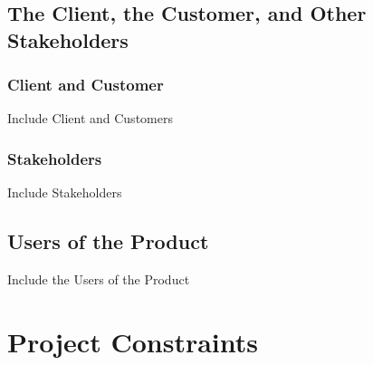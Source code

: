 \documentclass [11pt]{article}
\begin{document}
\subsection{The Client, the Customer, and Other Stakeholders}

\subsubsection{Client and Customer}
Include Client and Customers

\subsubsection{Stakeholders}
 Include Stakeholders
%

\subsection{Users of the Product} 
Include the Users of the Product



\section{\textbf{Project Constraints}}
\end{document}
